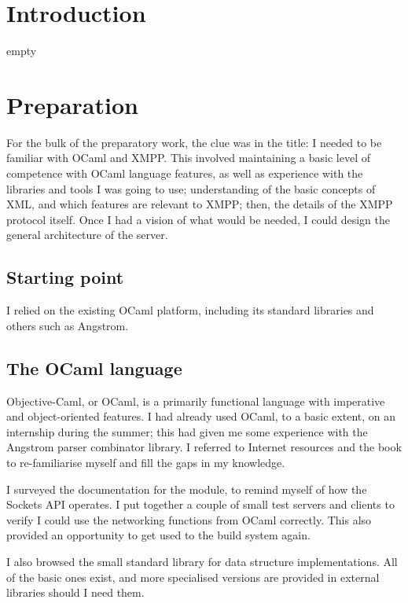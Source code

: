 \documentclass[12pt,a4paper,twoside,openright]{report}
\begin{document}
{%

\pagestyle{headings}

\chapter{Introduction}
empty

\chapter{Preparation}
For the bulk of the preparatory work, the clue was in the title: I needed to be familiar with OCaml and XMPP. This involved maintaining a basic level of competence with OCaml language features, as well as experience with the libraries and tools I was going to use; understanding of the basic concepts of XML, and which features are relevant to XMPP; then, the details of the XMPP protocol itself. Once I had a vision of what would be needed, I could design the general architecture of the server.

\section{Starting point}
I relied on the existing OCaml platform, including its standard libraries and others such as Angstrom.

\section{The OCaml language}
Objective-Caml, or OCaml, is a primarily functional language with imperative and object-oriented features. I had already used OCaml, to a basic extent, on an internship during the summer; this had given me some experience with the Angstrom parser combinator library. I referred to Internet resources and the  book to re-familiarise myself and fill the gaps in my knowledge.

I surveyed the documentation for the  module, to remind myself of how the Sockets API operates. I put together a couple of small test servers and clients to verify I could use the networking functions from OCaml correctly. This also provided an opportunity to get used to the build system again.

I also browsed the small standard library for data structure implementations. All of the basic ones exist, and more specialised versions are provided in external libraries should I need them.

}
\end{document}
